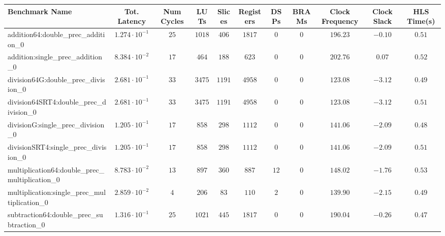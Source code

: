 \begin{tabular}{|l|c|c|c|c|c|c|c|c|c|c|}
\hline
Benchmark Name                                   & Tot. Latency            & Num Cycles & LUTs      & Slices   & Registers & DSPs   & BRAMs & Clock Frequency & Clock Slack & HLS Time(s) \\
\hline
addition64:double\_prec\_addition\_0             & $ 1.274 \cdot 10^{-1} $ & $ 25     $ & $ 1018  $ & $ 406  $ & $ 1817  $ & $ 0  $ & $ 0 $ & $ 196.23      $ & $ -0.10   $ & $ 0.51    $ \\
addition:single\_prec\_addition\_0               & $ 8.384 \cdot 10^{-2} $ & $ 17     $ & $ 464   $ & $ 188  $ & $ 623   $ & $ 0  $ & $ 0 $ & $ 202.76      $ & $ 0.07    $ & $ 0.52    $ \\
division64G:double\_prec\_division\_0            & $ 2.681 \cdot 10^{-1} $ & $ 33     $ & $ 3475  $ & $ 1191 $ & $ 4958  $ & $ 0  $ & $ 0 $ & $ 123.08      $ & $ -3.12   $ & $ 0.49    $ \\
division64SRT4:double\_prec\_division\_0         & $ 2.681 \cdot 10^{-1} $ & $ 33     $ & $ 3475  $ & $ 1191 $ & $ 4958  $ & $ 0  $ & $ 0 $ & $ 123.08      $ & $ -3.12   $ & $ 0.51    $ \\
divisionG:single\_prec\_division\_0              & $ 1.205 \cdot 10^{-1} $ & $ 17     $ & $ 858   $ & $ 298  $ & $ 1112  $ & $ 0  $ & $ 0 $ & $ 141.06      $ & $ -2.09   $ & $ 0.48    $ \\
divisionSRT4:single\_prec\_division\_0           & $ 1.205 \cdot 10^{-1} $ & $ 17     $ & $ 858   $ & $ 298  $ & $ 1112  $ & $ 0  $ & $ 0 $ & $ 141.06      $ & $ -2.09   $ & $ 0.51    $ \\
multiplication64:double\_prec\_multiplication\_0 & $ 8.783 \cdot 10^{-2} $ & $ 13     $ & $ 897   $ & $ 360  $ & $ 887   $ & $ 12 $ & $ 0 $ & $ 148.02      $ & $ -1.76   $ & $ 0.53    $ \\
multiplication:single\_prec\_multiplication\_0   & $ 2.859 \cdot 10^{-2} $ & $ 4      $ & $ 206   $ & $ 83   $ & $ 110   $ & $ 2  $ & $ 0 $ & $ 139.90      $ & $ -2.15   $ & $ 0.49    $ \\
subtraction64:double\_prec\_subtraction\_0       & $ 1.316 \cdot 10^{-1} $ & $ 25     $ & $ 1021  $ & $ 445  $ & $ 1817  $ & $ 0  $ & $ 0 $ & $ 190.04      $ & $ -0.26   $ & $ 0.47    $ \\

\end{tabular}
